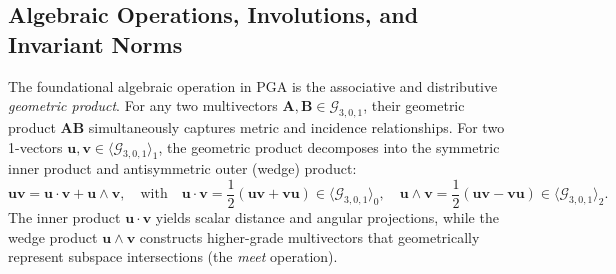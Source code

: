 \documentclass[10pt]{article}
\begin{document}
\subsection{Algebraic Operations, Involutions, and Invariant Norms}
\label{subsec:pga_ops}

The foundational algebraic operation in PGA is the associative and distributive \emph{geometric product}. For any two multivectors $\mathbf{A}, \mathbf{B} \in \mathcal{G}_{3,0,1}$, their geometric product $\mathbf{A}\mathbf{B}$ simultaneously captures metric and incidence relationships. For two 1-vectors $\mathbf{u}, \mathbf{v} \in \langle \mathcal{G}_{3,0,1} \rangle_1$, the geometric product decomposes into the symmetric inner product and antisymmetric outer (wedge) product:
\begin{equation}
    \mathbf{u}\mathbf{v} = \mathbf{u} \cdot \mathbf{v} + \mathbf{u} \wedge \mathbf{v}, \quad \text{with} \quad \mathbf{u} \cdot \mathbf{v} = \frac{1}{2}(\mathbf{u}\mathbf{v} + \mathbf{v}\mathbf{u}) \in \langle \mathcal{G}_{3,0,1} \rangle_0, \quad \mathbf{u} \wedge \mathbf{v} = \frac{1}{2}(\mathbf{u}\mathbf{v} - \mathbf{v}\mathbf{u}) \in \langle \mathcal{G}_{3,0,1} \rangle_2.
\end{equation}
The inner product $\mathbf{u} \cdot \mathbf{v}$ yields scalar distance and angular projections, while the wedge product $\mathbf{u} \wedge \mathbf{v}$ constructs higher-grade multivectors that geometrically represent subspace intersections (the \emph{meet} operation).
\end{document}
